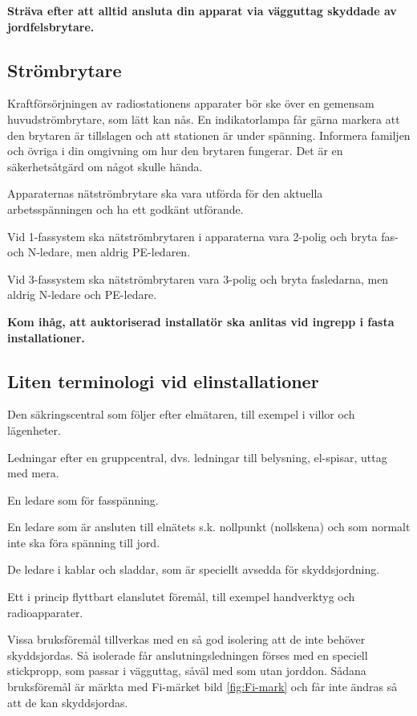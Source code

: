 \textbf{Sträva efter att alltid ansluta din apparat via vägguttag
	skyddade av jordfelsbrytare.}


\subsection{Strömbrytare}

Kraftförsörjningen av radiostationens apparater bör ske över en
gemensam huvudströmbrytare, som lätt kan nås.
En indikatorlampa får gärna markera att den brytaren är tillslagen och att
stationen är under spänning.
Informera familjen och övriga i din omgivning om hur den brytaren fungerar.
Det är en säkerhetsåtgärd om något skulle hända.

Apparaternas nätströmbrytare ska vara utförda för den aktuella arbetsspänningen
och ha ett godkänt utförande.

Vid 1-fassystem ska nätströmbrytaren i apparaterna vara 2-polig och bryta fas-
och N-ledare, men aldrig PE-ledaren.

Vid 3-fassystem ska nätströmbrytaren vara 3-polig och bryta fasledarna, men
aldrig N-ledare och PE-ledare.

\textbf{Kom ihåg, att auktoriserad installatör ska
  anlitas vid ingrepp i fasta installationer.}

\subsection{Liten terminologi vid elinstallationer}
\begin{description}[style=nextline]
\item[Gruppcentral] Den säkringscentral som följer efter elmätaren,
  till exempel i villor och lägenheter.

\item[Gruppledningar] Ledningar efter en gruppcentral, dvs.
  ledningar till belysning, el-spisar, uttag med mera.

\item[Fasledare] En ledare som för fasspänning.

\item[Nolledare (N-ledare)] En ledare som är ansluten till elnätets s.k.
  nollpunkt (nollskena) och som normalt inte ska föra spänning till jord.

\item[Skyddsledare (PE-ledare)] De ledare i kablar och sladdar, som är
  speciellt avsedda för skyddsjordning.

\item[Bruksföremål] Ett i princip flyttbart elanslutet föremål,
  till exempel handverktyg och radioapparater.

\item[Förstärkt isolering] Vissa bruksföremål tillverkas med en så god
  isolering att de inte behöver skyddsjordas.
  Så isolerade får anslutningsledningen förses med en speciell stickpropp,
  som passar i vägguttag, såväl med som utan jorddon.
  Sådana bruksföremål är märkta med Fi-märket bild \ref{fig:Fi-mark} och får
  inte ändras så att de kan skyddsjordas.
\end{description}

